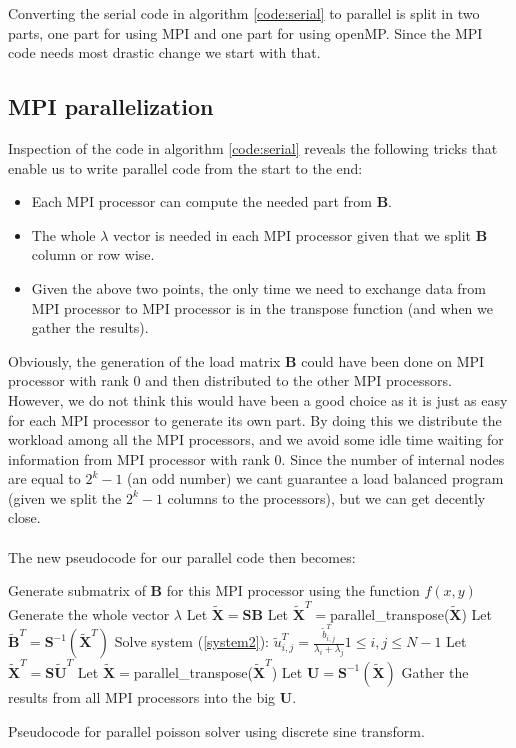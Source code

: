 Converting the serial code in algorithm \ref{code:serial} to parallel is split in two parts, one part for using MPI and one part for using openMP. Since the MPI code needs most drastic change we start with that.

\subsection*{MPI parallelization}
Inspection of the code in algorithm \ref{code:serial} reveals the following tricks that enable us to write parallel code from the start to the end:
\begin{itemize}
\item Each MPI processor can compute the needed part from $\textbf{B}$.
\item The whole $\lambda$ vector is needed in each MPI processor given that we split $\textbf{B}$ column or row wise.
\item Given the above two points, the only time we need to exchange data from MPI processor to MPI processor is in the transpose function (and when we gather the results).
\end{itemize}
Obviously, the generation of the load matrix $\mathbf{B}$ could have been done on MPI processor with rank $0$ and then distributed to the other MPI processors. However, we do not think this would have been a good choice as it is just as easy for each MPI processor to generate its own part. By doing this we distribute the workload among all the MPI processors, and we avoid some idle time waiting for information from MPI processor with rank $0$. Since the number of internal nodes are equal to $2^k-1$ (an odd number) we cant guarantee a load balanced program (given we split the $2^k-1$ columns to the processors), but we can get decently close.\\
\\
The new pseudocode for our parallel code then becomes:\\
\begin{algorithm}[H]
 Generate submatrix of $\textbf{B}$ for this MPI processor using the function $f(x,y)$\;
 Generate the whole vector $\lambda$ \;
 Let $\mathbf{\widetilde{X}} = \mathbf{SB}$  \;
 Let $\mathbf{\widetilde{X}}^T = $parallel\_transpose($\mathbf{\widetilde{X}}$)   \;
 Let $\mathbf{\widetilde{B}}^T = \mathbf{S}^{-1}(\mathbf{\widetilde{X}}^T)$ \;
 Solve system (\ref{system2}): $\tilde{u}^T_{i,j} = \frac{\tilde{b}^T_{i,j}}{\lambda_i + \lambda_j} 1 \leq i, j \leq N-1$\;
 Let $\mathbf{\widetilde{X}}^T = \mathbf{S}\mathbf{\tilde{U}}^T$  \;
 Let $\mathbf{\widetilde{X}} = $parallel\_transpose($\mathbf{\widetilde{X}}^T$)   \;
 Let $\mathbf{U} = \mathbf{S}^{-1}(\mathbf{\widetilde{X}}) $ \;
 Gather the results from all MPI processors into the big $\mathbf{U}$.
 \caption{Pseudocode for parallel poisson solver using discrete sine transform.}
 \label{code:parallel}
\end{algorithm}
